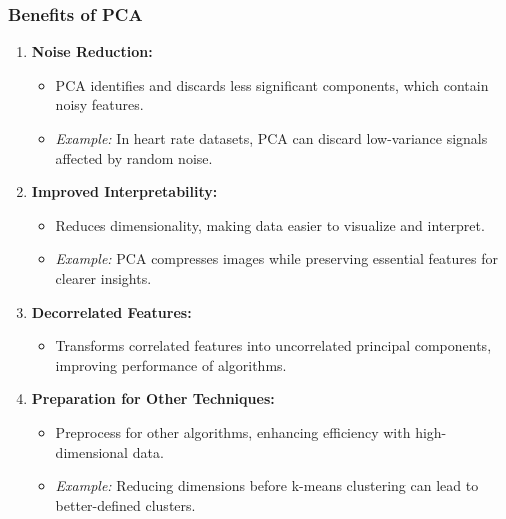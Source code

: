 \documentclass[aspectratio=169]{beamer}
\begin{document}
\begin{frame}[fragile]
    \frametitle{Benefits of PCA}
    \begin{enumerate}
        \item \textbf{Noise Reduction:}
            \begin{itemize}
                \item PCA identifies and discards less significant components, which contain noisy features.
                \item \textit{Example:} In heart rate datasets, PCA can discard low-variance signals affected by random noise.
            \end{itemize}
        
        \item \textbf{Improved Interpretability:}
            \begin{itemize}
                \item Reduces dimensionality, making data easier to visualize and interpret.
                \item \textit{Example:} PCA compresses images while preserving essential features for clearer insights.
            \end{itemize}

        \item \textbf{Decorrelated Features:}
            \begin{itemize}
                \item Transforms correlated features into uncorrelated principal components, improving performance of algorithms.
            \end{itemize}
        
        \item \textbf{Preparation for Other Techniques:}
            \begin{itemize}
                \item Preprocess for other algorithms, enhancing efficiency with high-dimensional data.
                \item \textit{Example:} Reducing dimensions before k-means clustering can lead to better-defined clusters.
            \end{itemize}
    \end{enumerate}
\end{frame}
\end{document}
